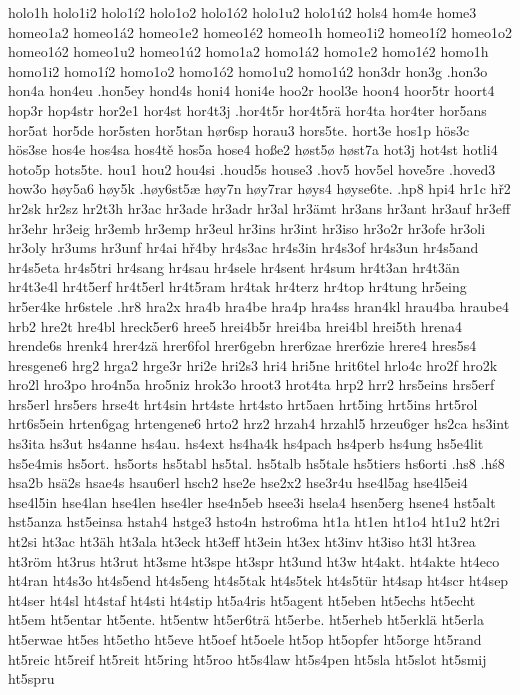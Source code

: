 holo1h
holo1i2
holo1í2
holo1o2
holo1ó2
holo1u2
holo1ú2
hols4
hom4e
home3
homeo1a2
homeo1á2
homeo1e2
homeo1é2
homeo1h
homeo1i2
homeo1í2
homeo1o2
homeo1ó2
homeo1u2
homeo1ú2
homo1a2
homo1á2
homo1e2
homo1é2
homo1h
homo1i2
homo1í2
homo1o2
homo1ó2
homo1u2
homo1ú2
hon3dr
hon3g
.hon3o
hon4a
hon4eu
.hon5ey
hond4s
honi4
honi4e
hoo2r
hool3e
hoon4
hoor5tr
hoort4
hop3r
hop4str
hor2e1
hor4st
hor4t3j
.hor4t5r
hor4t5rä
hor4ta
hor4ter
hor5ans
hor5at
hor5de
hor5sten
hor5tan
hør6sp
horau3
hors5te.
hort3e
hos1p
hös3c
hös3se
hos4e
hos4sa
hos4tě
hos5a
hose4
hoße2
høst5ø
høst7a
hot3j
hot4st
hotli4
hoto5p
hots5te.
hou1
hou2
hou4si
.houd5s
house3
.hov5
hov5el
hove5re
.hoved3
how3o
høy5a6
høy5k
.høy6st5æ
høy7n
høy7rar
høys4
høyse6te.
.hp8
hpi4
hr1c
hř2
hr2sk
hr2sz
hr2t3h
hr3ac
hr3ade
hr3adr
hr3al
hr3ämt
hr3ans
hr3ant
hr3auf
hr3eff
hr3ehr
hr3eig
hr3emb
hr3emp
hr3eul
hr3ins
hr3int
hr3iso
hr3o2r
hr3ofe
hr3oli
hr3oly
hr3ums
hr3unf
hr4ai
hř4by
hr4s3ac
hr4s3in
hr4s3of
hr4s3un
hr4s5and
hr4s5eta
hr4s5tri
hr4sang
hr4sau
hr4sele
hr4sent
hr4sum
hr4t3an
hr4t3än
hr4t3e4l
hr4t5erf
hr4t5erl
hr4t5ram
hr4tak
hr4terz
hr4top
hr4tung
hr5eing
hr5er4ke
hr6stele
.hr8
hra2x
hra4b
hra4be
hra4p
hra4ss
hran4kl
hrau4ba
hraube4
hrb2
hre2t
hre4bl
hreck5er6
hree5
hrei4b5r
hrei4ba
hrei4bl
hrei5th
hrena4
hrende6s
hrenk4
hrer4zä
hrer6fol
hrer6gebn
hrer6zae
hrer6zie
hrere4
hres5s4
hresgene6
hrg2
hrga2
hrge3r
hri2e
hri2s3
hri4
hri5ne
hrit6tel
hrlo4c
hro2f
hro2k
hro2l
hro3po
hro4n5a
hro5niz
hrok3o
hroot3
hrot4ta
hrp2
hrr2
hrs5eins
hrs5erf
hrs5erl
hrs5ers
hrse4t
hrt4sin
hrt4ste
hrt4sto
hrt5aen
hrt5ing
hrt5ins
hrt5rol
hrt6s5ein
hrten6gag
hrtengene6
hrto2
hrz2
hrzah4
hrzahl5
hrzeu6ger
hs2ca
hs3int
hs3ita
hs3ut
hs4anne
hs4au.
hs4ext
hs4ha4k
hs4pach
hs4perb
hs4ung
hs5e4lit
hs5e4mis
hs5ort.
hs5orts
hs5tabl
hs5tal.
hs5talb
hs5tale
hs5tiers
hs6orti
.hs8
.hś8
hsa2b
hsä2s
hsae4s
hsau6erl
hsch2
hse2e
hse2x2
hse3r4u
hse4l5ag
hse4l5ei4
hse4l5in
hse4lan
hse4len
hse4ler
hse4n5eb
hsee3i
hsela4
hsen5erg
hsene4
hst5alt
hst5anza
hst5einsa
hstah4
hstge3
hsto4n
hstro6ma
ht1a
ht1en
ht1o4
ht1u2
ht2ri
ht2si
ht3ac
ht3äh
ht3ala
ht3eck
ht3eff
ht3ein
ht3ex
ht3inv
ht3iso
ht3l
ht3rea
ht3röm
ht3rus
ht3rut
ht3sme
ht3spe
ht3spr
ht3und
ht3w
ht4akt.
ht4akte
ht4eco
ht4ran
ht4s3o
ht4s5end
ht4s5eng
ht4s5tak
ht4s5tek
ht4s5tür
ht4sap
ht4scr
ht4sep
ht4ser
ht4sl
ht4staf
ht4sti
ht4stip
ht5a4ris
ht5agent
ht5eben
ht5echs
ht5echt
ht5em
ht5entar
ht5ente.
ht5entw
ht5er6trä
ht5erbe.
ht5erheb
ht5erklä
ht5erla
ht5erwae
ht5es
ht5etho
ht5eve
ht5oef
ht5oele
ht5op
ht5opfer
ht5orge
ht5rand
ht5reic
ht5reif
ht5reit
ht5ring
ht5roo
ht5s4law
ht5s4pen
ht5sla
ht5slot
ht5smij
ht5spru
